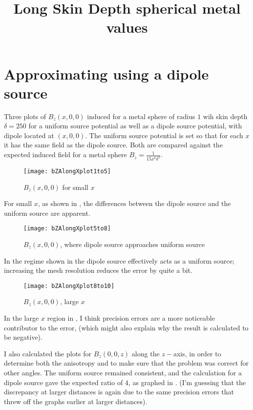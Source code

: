 \documentclass[11pt]{article}
\title{Long Skin Depth spherical metal values}
\date{}
\author{}
\begin{document}
\graphicspath{{figures/}}

\maketitle

\section{Approximating using a dipole source}\label{sec:spheredipolesource}

Three plots of $B_z(x, 0, 0)$ induced for a metal sphere of radius $1$ wih skin depth $\delta = 250$ for a uniform source potential as well
as a dipole source potential, with dipole located at $(x, 0, 0)$.
The uniform source potential is set so that for each $x$ it has the same field as the dipole source.
Both are compared against the expected induced field for a metal sphere $B_z = \frac{1}{15 x^6 \delta^2}$.

\begin{figure}[htp]
	\centering
	\texttt{[image: bZAlongXplot1to5]}
	\caption{$B_z(x, 0, 0)$ for small $x$ \label{fig:bZXplotx1to5}}
\end{figure}

For small $x$, as shown in , the differences between the dipole source and the uniform source are
apparent.

\begin{figure}[htp]
	\centering
	\texttt{[image: bZAlongXplot5to8]}
	\caption{$B_z(x, 0, 0)$, where dipole source approaches uniform source \label{fig:bZXplotx5to8}}
\end{figure}

In the regime shown in  the dipole source effectively acts as a uniform source;
increasing the mesh resolution reduces the error by quite a bit.

\begin{figure}[htp]
	\centering
	\texttt{[image: bZAlongXplot8to10]}
	\caption{$B_z(x, 0, 0)$, large $x$ \label{fig:bZXplotx8to10}}
\end{figure}

In the large $x$ region in , I think precision errors are a more noticeable contributor to the
error, (which might also explain why the result is calculated to be negative).

I also calculated the plots for $B_z(0, 0, z)$ along the $z-$axis, in order to determine both the anisotropy and to
make sure that the problem was correct for other angles.
The uniform source remained consistent, and the calculation for a dipole source gave the expected ratio of $4$,
as graphed in . (I'm guessing that the discrepancy at larger distances is again due to
the same precision errors that threw off the graphs earlier at larger distances).
\end{document}
